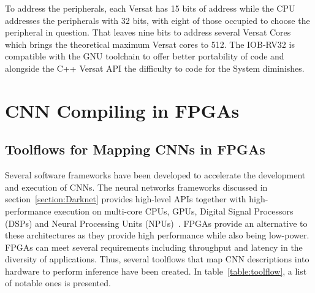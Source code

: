 \documentclass[conference]{IEEEtran}
\begin{document}
To address the peripherals, each Versat has 15 bits of address while the CPU addresses
 the peripherals with 32 bits, with eight of those occupied to choose
 the peripheral in question. That leaves nine bits to address several Versat Cores
 which brings the theoretical maximum Versat cores to 512. The IOB-RV32 is compatible with the
 GNU toolchain to offer better portability of code and alongside the C++ Versat API the difficulty
 to code for the System diminishes.


\section{CNN Compiling in FPGAs}
\label{section:CNNVersat}

%

\subsection{Toolflows for Mapping CNNs in FPGAs}
\label{section:toolflow}

Several software frameworks have been developed to accelerate the development and
execution of CNNs. The neural networks frameworks discussed in
section~\ref{section:Darknet} provides high-level APIs together with high-performance 
execution on multi-core CPUs, GPUs, Digital Signal Processors (DSPs)
and Neural Processing Units (NPUs)~\cite{smartphones}. FPGAs provide an
alternative to these architectures as they provide high performance while also
being low-power. FPGAs can meet several requirements including throughput and latency
in the diversity of applications. Thus, several toolflows that map CNN descriptions
into hardware to perform inference have been created. In
table~\ref{table:toolflow}, a list of notable ones is presented.
\end{document}
